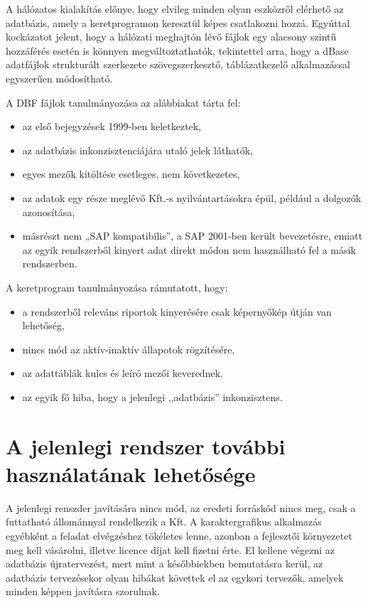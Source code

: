 \documentclass[a4paper,12pt]{report}
\begin{document}
A hálózatos kialakítás előnye, hogy elvileg minden olyan eszközről elérhető az
adatbázis, amely a keretprogramon keresztül képes csatlakozni hozzá. Egyúttal 
kockázatot jelent, hogy a hálózati meghajtón lévő fájlok egy alacsony szintű 
hozzáférés esetén is könnyen megváltoztathatók, tekintettel arra, hogy a dBase 
adatfájlok strukturált szerkezete szövegszerkesztő, táblázatkezelő 
alkalmazással egyszerűen módosítható.

A DBF fájlok tanulmányozása az alábbiakat tárta fel:
\begin{itemize}
\item az első bejegyzések 1999-ben keletkeztek,
\item az adatbázis inkonzisztenciájára utaló jelek láthatók,
\item egyes mezők kitöltése esetleges, nem következetes,
\item az adatok egy része meglévő Kft.-s nyilvántartásokra épül, például a
dolgozók azonosítása,
\item másrészt nem „SAP kompatibilis”, a SAP 2001-ben került bevezetésre, emiatt 
az egyik rendszerből kinyert adat direkt módon nem használható fel a másik 
rendszerben.
\end{itemize}
A keretprogram tanulmányozása rámutatott, hogy:
\begin{itemize}
\item a rendszerből releváns riportok kinyerésére csak képernyőkép útján van
lehetőség,
\item nincs mód az aktív-inaktív állapotok rögzítésére,
\item az adattáblák kulcs és leíró mezői keverednek.
\item az egyik fő hiba, hogy a jelenlegi ,,adatbázis'' inkonzisztens.
\end{itemize}

\section{A jelenlegi rendszer további használatának lehetősége}

A jelenlegi renszder javítására nincs mód, az eredeti forráskód nincs meg, csak
a futtatható állománnyal rendelkezik a Kft. 
A karaktergrafikus alkalmazás egyébként a feladat elvégzéshez tökéletes lenne, 
azonban a fejlesztői környezetet meg kell vásárolni, illetve licence díjat kell 
fizetni érte.
El kellene végezni az adatbázis újratervezést, mert mint a későbbiekben 
bemutatásra kerül, az adatbázis tervezésekor olyan hibákat követtek el az 
egykori tervezők, amelyek minden képpen javításra szorulnak.
\end{document}
